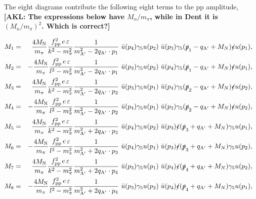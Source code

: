 \documentclass[nofootinbib,prd,superscriptaddress,twocolumn]{revtex4}
\newcommand{\qa}{q_{\mathrm{A}'}}
\newcommand{\Aprime}{\mathrm{A}'}
\newcommand{\akl}[1]{{{\bf{\color{Blue}[AKL: #1]}}}}
\begin{document}
The eight diagrams contribute the following eight terms to the pp amplitude, 
\akl{The expressions below have $M_n/m_\pi$, while in Dent it is $(M_n/m_\pi)^2$.  Which is correct?}
%
\begin{widetext}
\begin{eqnarray}
	M_1 &=& \frac{4 M_{\mathrm N}}{ m_\pi} \frac{f_{\mathrm{pp}}^2\, e\, \varepsilon}{k^2-m_\pi^2}  \frac{1}{m_{\mathrm{\Aprime}}^2 - 2 \qa \cdot p_1}\ 
	\bar{u}(p_4) \gamma_5 u(p_2)\  \bar{u}(p_3) \gamma_5 (\slashed{p}_1 - \qa +M_N)\slashed \epsilon  u(p_1), \\
	M_2 &=& -\frac{4 M_{\mathrm N}}{ m_\pi} \frac{f_{\mathrm{pp}}^2\, e\, \varepsilon}{l^2-m_\pi^2}  \frac{1}{m_{\mathrm{\Aprime}}^2 - 2 \qa \cdot p_1}\  
	\bar{u}(p_3) \gamma_5 u(p_2)\  \bar{u}(p_4) \gamma_5 (\slashed{p}_1 - \qa +M_N)\slashed{\epsilon} u(p_1),\\
	M_3 &=& \frac{4 M_{\mathrm N}}{ m_\pi} \frac{f_{\mathrm{pp}}^2\, e\, \varepsilon}{k^2-m_\pi^2}  \frac{1}{m_{\mathrm{\Aprime}}^2 - 2 \qa \cdot p_2}\ 
	\bar{u}(p_3) \gamma_5 u(p_1)\ \bar{u}(p_4) \gamma_5 (\slashed{p}_2 - \qa +M_N)\slashed \epsilon  u(p_2), \\
	M_4 &=& -\frac{4 M_{\mathrm N}}{ m_\pi} \frac{f_{\mathrm{pp}}^2\, e\, \varepsilon}{l^2-m_\pi^2}  \frac{1}{m_{\mathrm{\Aprime}}^2 - 2 \qa \cdot p_2}\ 
	\bar{u}(p_4) \gamma_5 u(p_1)\ \bar{u}(p_3) \gamma_5 (\slashed{p}_2 - \qa +M_N)\slashed \epsilon  u(p_2), \\
	M_5 &=& \frac{4 M_{\mathrm N}}{ m_\pi} \frac{f_{\mathrm{pp}}^2\, e\, \varepsilon}{k^2-m_\pi^2}  \frac{1}{m_{\mathrm{\Aprime}}^2 + 2 \qa \cdot p_3}\
	\bar{u}(p_4) \gamma_5 u(p_2)\ \bar{u}(p_3) \slashed{\epsilon} (\slashed{p}_3 + \qa +M_N)\gamma_5 u(p_1),\\
	M_6 &=& -\frac{4 M_{\mathrm N}}{ m_\pi} \frac{f_{\mathrm{pp}}^2\, e\, \varepsilon}{l^2-m_\pi^2}  \frac{1}{m_{\mathrm{\Aprime}}^2 + 2 \qa \cdot p_3}\ 
	\bar{u}(p_4) \gamma_5 u(p_1)\ \bar{u}(p_3) \slashed{\epsilon} (\slashed{p}_3 + \qa +M_N)\gamma_5 u(p_2),\\
	M_7 &=& \frac{4 M_{\mathrm N}}{ m_\pi} \frac{f_{\mathrm{pp}}^2\, e\, \varepsilon}{k^2-m_\pi^2}  \frac{1}{m_{\mathrm{\Aprime}}^2 + 2 \qa \cdot p_4}\ 
	\bar{u}(p_3) \gamma_5 u(p_1)\ \bar{u}(p_4) \slashed{\epsilon} (\slashed{p}_4 + \qa +M_N)\gamma_5 u(p_2),\\
	M_8 &=& -\frac{4 M_{\mathrm N}}{ m_\pi} \frac{f_{\mathrm{pp}}^2\, e\, \varepsilon}{l^2-m_\pi^2}  \frac{1}{m_{\mathrm{\Aprime}}^2 + 2 \qa \cdot p_4}\ 
	\bar{u}(p_3) \gamma_5 u(p_2)\ \bar{u}(p_4) \slashed{\epsilon} (\slashed{p}_4 + \qa +M_N)\gamma_5 u(p_1),
\end{eqnarray}
\end{widetext}
\end{document}
